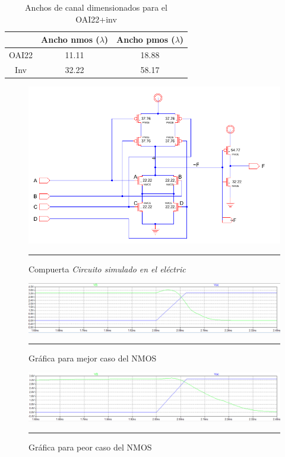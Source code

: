 \documentclass[12pt,a4paper]{article} %
\begin{document}
\begin{table}\label{table:ancho_canal}
\begin{center}
\begin{tabular}{c||c||c}
  & Ancho nmos ($\lambda$) & Ancho pmos ($\lambda$)\\
\hline
\hline
OAI22 & 11.11 & 18.88 \\
Inv & 32.22 & 58.17 \\
\hline
\end{tabular}
\caption{Anchos de canal dimensionados para el OAI22+inv}
\end{center}
\end{table}

\begin{figure}[htbp]
  \centering
    \includegraphics[scale=0.5]{./Cicuito_Electric.png}
    \rule{35em}{0.5pt}
  \caption[IdealvsSim]{Compuerta \textit{Circuito simulado en el eléctric}}
  \label{fig:circuito_E}
\end{figure}

\begin{figure}[htbp]
\begin{center}
    \includegraphics[scale=0.5]{./Mejor_caso_red_nmos.png}
    \rule{35em}{0.5pt}
  \caption[Captura]{Gráfica para mejor caso del NMOS}
  \label{fig:m_nmos}
  \end{center}
\end{figure}

\begin{figure}[htbp]
\begin{center}
    \includegraphics[scale=0.5]{./Peor_caso_red_nmos.png}
    \rule{35em}{0.5pt}
  \caption[Captura]{Gráfica para peor caso del NMOS}
  \label{fig:p_nmos}
  \end{center}
\end{figure}
\end{document}
